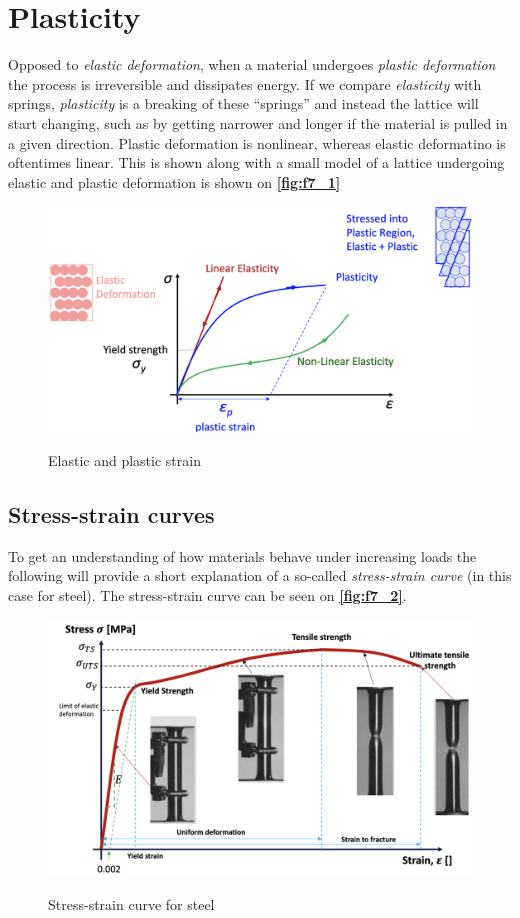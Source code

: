 
\section{Plasticity}
Opposed to \textit{elastic deformation}, when a material undergoes \textit{plastic deformation} the process is irreversible and dissipates energy. If we compare \textit{elasticity} with springs, \textit{plasticity} is a breaking of these ``springs'' and instead the lattice will start changing, such as by getting narrower and longer if the material is pulled in a given direction. Plastic deformation is nonlinear, whereas elastic deformatino is oftentimes linear. This is shown along with a small model of a lattice undergoing elastic and plastic deformation is shown on \textbf{\autoref{fig:f7_1}}

\begin{figure} [ht]
  \centering
  \caption{Elastic and plastic strain}
  \includegraphics[width=0.6\linewidth]{./figures/f7_1.png}
  \label{fig:f7_1}
\end{figure}

\subsection{Stress-strain curves}
To get an understanding of how materials behave under increasing loads the following will provide a short explanation of a so-called \textit{stress-strain curve} (in this case for steel). The stress-strain curve can be seen on \textbf{\autoref{fig:f7_2}}.

\begin{figure} [ht]
  \centering
  \caption{Stress-strain curve for steel}
  \includegraphics[width=0.7\linewidth]{./figures/f7_2.png}
  \label{fig:f7_2}
\end{figure}

